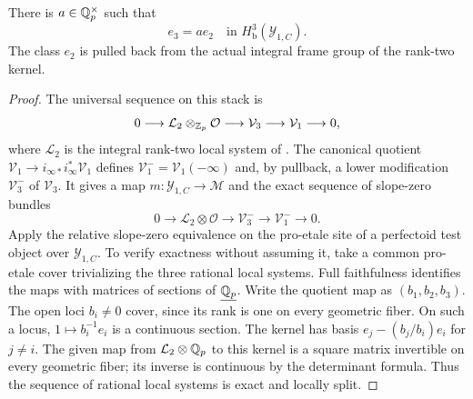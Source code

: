 \begin{proposition}
\label{h3:prop:trace-transport}
There is $a\in\mathbb Q_p^\times$ such that
\begin{equation}\label{h3:eq:rat-ordinary-traces}
 e_3=a e_2\quad\text{in }H^3_{\mathrm b}(\mathcal Y_{1,C}).
\end{equation}
The class $e_2$ is pulled back from the actual integral frame
group of the rank-two kernel.
\end{proposition}

\begin{proof}
The universal sequence on this stack is
\[
 0\longrightarrow\mathcal L_2\otimes_{\mathbb Z_p}\mathcal O
 \longrightarrow\mathcal V_3\longrightarrow\mathcal V_1
 \longrightarrow0,
\]
where $\mathcal L_2$ is the integral rank-two local system of
.  The canonical quotient
$\mathcal V_1\to i_{\infty*}i_\infty^*\mathcal V_1$ defines
$\mathcal V_1^- =\mathcal V_1(-\infty)$ and, by pullback,
a lower modification $\mathcal V_3^-$ of $\mathcal V_3$.
It gives a map $m:\mathcal Y_{1,C}\to\mathcal M$ and the exact
sequence of slope-zero bundles
\[
 0\longrightarrow\mathcal L_2\otimes\mathcal O
 \longrightarrow\mathcal V_3^-
 \longrightarrow\mathcal V_1^-\longrightarrow0.
\]
Apply the relative slope-zero equivalence on the pro-etale
site of a perfectoid test object over $\mathcal Y_{1,C}$.
To verify exactness without assuming it, take a common
pro-etale cover trivializing the three rational local systems.
Full faithfulness identifies the maps with matrices of
sections of $\underline{\mathbb Q_p}$.  Write the quotient map as
$(b_1,b_2,b_3)$.  The open loci $b_i\ne0$ cover, since its
rank is one on every geometric fiber.  On such a locus,
$1\mapsto b_i^{-1}e_i$ is a continuous section.  The kernel
has basis $e_j-(b_j/b_i)e_i$ for $j\ne i$.  The given map
from $\mathcal L_2\otimes\mathbb Q_p$ to this kernel is a square
matrix invertible on every geometric fiber; its inverse is
continuous by the determinant formula.  Thus the sequence
of rational local systems is exact and locally split.


\end{proof}
